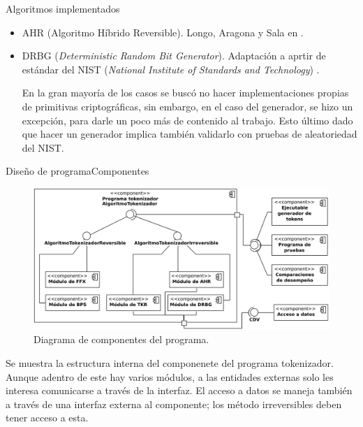 \begin{frame}{Algoritmos implementados}
\begin{itemize}
\begin{itemize}
        \item<6-> AHR (Algoritmo Híbrido Reversible). Longo, Aragona y Sala
          en \cite{aragona}.

        \item<7-> DRBG (\textit{Deterministic Random Bit Generator}). Adaptación
          a aprtir de estándar del NIST (\textit{National Institute of Standards
          and Technology}) \cite{nist_aleatorios}.

          {
            En la gran mayoría de los casos se buscó no hacer implementaciones
            propias de primitivas criptográficas, sin embargo, en el caso del
            generador, se hizo un excepción, para darle un poco más de contenido
            al trabajo. Esto último dado que hacer un generador implica también
            validarlo con pruebas de aleatoriedad del NIST.
          }

      \end{itemize}
  \end{itemize}
\end{frame}

\begin{frame}{Diseño de programa}{Componentes}

  \begin{figure}[H]
    \begin{center}
      \includegraphics[width=1.0\linewidth]
        {../../../diagramas_comunes/disenio/componentes_v2.png}
      \caption{Diagrama de componentes del programa.}
    \end{center}
  \end{figure}

  \note
  {
    Se muestra la estructura interna del componenete del programa
    tokenizador. Aunque adentro de este hay varios módulos, a las entidades
    externas solo les interesa comunicarse a través de la interfaz. El acceso
    a datos se maneja también a través de una interfaz externa al componente;
    los método irreversibles deben tener acceso a esta.
  }

\end{frame}
